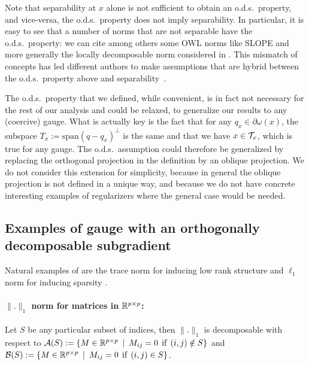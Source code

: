 \documentclass{article}
\begin{document}
Note that separability at $x$ alone is not sufficient to obtain an o.d.s.\ property, and vice-versa, the o.d.s.\ property does not imply separability. In particular, it is easy to see that a number of norms that are not separable have the o.d.s.\ property: we can cite among others some OWL norms like SLOPE and more generally the locally decomposable norm considered in \citet{obozinski2016unified}. This mismatch of concepts has led different authors to make assumptions that are hybrid between the o.d.s.\ property above and separability~\citep{candes2013simple,fadili2013stable,vaiter2015model}.

The o.d.s.\ property that we defined, while convenient, is in fact not necessary for the rest of our analysis and could be relaxed, to generalize our results to any (coercive) gauge. What is actually key is the fact that for any $q_x \in \partial \omega(x)$, the subspace $T_x:=\text{span}(q-q_x)^{\bot}$ is the same and that we have $x \in \mathcal{T}_x$, which is true for any gauge. 
The o.d.s.\ assumption could therefore be generalized by replacing the orthogonal projection in the definition by an oblique projection. We do not consider this extension for simplicity, because in general the oblique projection is not defined in a unique way, and because we do not have concrete interesting examples of regularizers where the general case would be needed. 




\subsection{Examples of gauge with an orthogonally decomposable subgradient}

Natural examples of are the trace norm for inducing low rank structure and $\ell_1$ norm for inducing sparsity .\\

\paragraph{$\|.\|_1$ norm for matrices in $\mathbb{R}^{p\times p}$: } Let $S$ be any particular subset of indices, then $\|.\|_1$ is decomposable with respect to $\mathcal{A}(S):=\left\lbrace M\in\mathbb{R}^{p\times p} \enskip | \enskip M_{ij}=0\:\: \text{if} \:\: (i,j) \notin S\right\rbrace$ and $\mathcal{B}(S):=\left\lbrace M\in\mathbb{R}^{p\times p} \enskip | \enskip M_{ij}=0 \:\: \text{if} \:\: (i,j) \in S\right\rbrace$.
\end{document}
